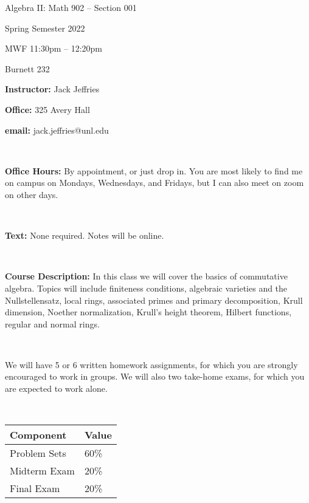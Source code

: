 \documentclass{amsart}
\begin{document}
 








\centerline{\bigbf Algebra II: Math 902 -- Section 001}
\centerline{\bigbf Spring Semester 2022}
\centerline{\bigbf MWF 11:30pm -- 12:20pm }
\centerline{\bigbf Burnett 232}



\bigskip

\noindent
{\bf Instructor:}  Jack Jeffries

\noindent
{\bf Office:} 325 Avery Hall

\noindent
{\bf email:} jack.jeffries@unl.edu

\

\noindent
{\bf Office Hours:} By appointment, or just drop in. You are most likely to find me on campus on Mondays, Wednesdays, and Fridays, but I can also meet on zoom on other days.


\

\noindent
{\bf Text:} None required. Notes will be online.


\

\noindent
{\bf Course Description:} 
In this class we will cover the basics of commutative algebra. Topics will include finiteness conditions, algebraic varieties and the Nullstellensatz, local rings, associated primes and primary decomposition, Krull dimension, Noether normalization, Krull's height theorem, Hilbert functions, regular and normal rings.

\


 We will have 5 or 6 written homework assignments, for which you are strongly encouraged to work in groups. We will also two take-home exams, for which you are expected to work alone. 

\


{\hfill \begin{tabular}{|l|l|}
\hline
Component & Value \\
\hline
Problem Sets & 60\% \\
\hline
Midterm Exam & 20\% \\
\hline
Final Exam & 20\% \\
\hline
\end{tabular} \hfill}

\
\end{document}
